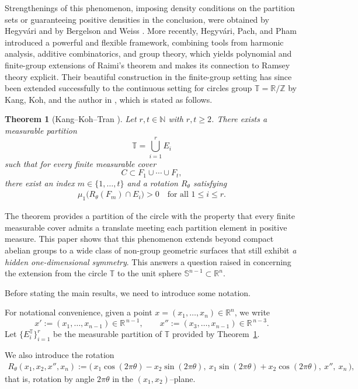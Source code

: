 \documentclass[11pt]{article}
\numberwithin{equation}{section}
\newtheorem{theorem}{Theorem}[section]
\theoremstyle{remark}
\begin{document}
Strengthenings of this phenomenon, imposing density conditions on the partition sets or guaranteeing positive densities in the conclusion, were obtained by Hegyv\'ari \cite{NH} and by Bergelson and Weiss \cite{Bergelson2}. More recently, Hegyv\'ari, Pach, and Pham \cite{HPP25} introduced a powerful and flexible framework, combining tools from harmonic analysis, additive combinatorics, and group theory, which yields polynomial and finite-group extensions of Raimi’s theorem and makes its connection to Ramsey theory explicit. Their beautiful construction in the finite-group setting has since been extended successfully to the continuous setting for circles group $\mathbb{T}=\mathbb{R}/\mathbb{Z}$ by Kang, Koh, and the author in \cite{KKT25}, which is stated as follows.
\begin{theorem}[Kang--Koh--Tran {\cite{KKT25}}]\label{thm:KKT-circle}
Let $r,t\in\mathbb{N}$ with $r,t\ge2$. There exists a measurable partition
\[
\mathbb{T}= \bigcup_{i=1}^r E_i
\]
such that for every finite measurable cover
\[
C \subset F_1 \cup \cdots \cup F_t,
\]
there exist an index $m \in \{1,\dots,t\}$ and a rotation $R_{\theta}$ satisfying
\begin{align*}
    \mu_1\big(R_{\theta}(F_m) \cap E_i\big) > 0
\quad\text{for all } 1\le i\le r.
\end{align*}
\end{theorem}
The theorem provides a partition of the circle with the property that every finite measurable cover admits a translate meeting each partition element in positive measure.  This paper shows that this phenomenon extends beyond compact abelian groups to a wide class of non-group geometric surfaces that still exhibit \textit{a hidden one-dimensional symmetry}. This answers a question raised in \cite{KKT25} concerning the extension from the circle $\mathbb{T}$ to the unit sphere $\mathbb{S}^{n-1}\subset \mathbb{R}^n$.


Before stating the main results, we need to introduce some notation.

For notational convenience, given a point 
$x=(x_1,\dots,x_n)\in\mathbb{R}^n$, we write
\[
x' := (x_1,\dots,x_{n-1}) \in \mathbb{R}^{\,n-1},
\qquad
x'' := (x_3,\dots,x_{n-1}) \in \mathbb{R}^{\,n-3}.
\]
Let $\{E_i^\mathbb{T}\}_{i=1}^r$ be the measurable partition of $\mathbb{T}$ provided by Theorem~\ref{thm:KKT-circle}.  

We also introduce the rotation
\begin{align}\label{definition-rotation}
R_\theta(x_1,x_2,x'',x_n)
 :=\bigl(\,
        x_1\cos(2\pi\theta) - x_2\sin(2\pi\theta),\ 
        x_1\sin(2\pi\theta) + x_2\cos(2\pi\theta),\ 
        x'',\ x_n
      \,\bigr),
\end{align}
that is, rotation by angle $2\pi\theta$ in the $(x_1,x_2)$–plane.
\end{document}
